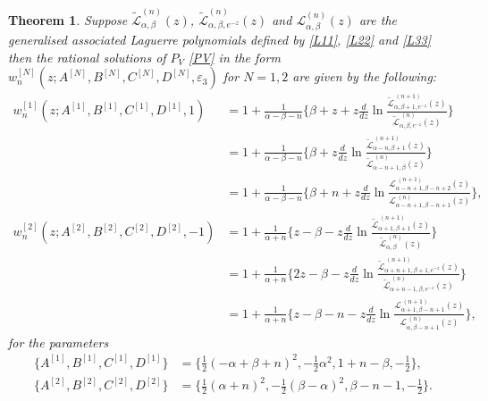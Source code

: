 \documentclass[12pt]{article}
\def\L{\mathcal{L}}
\newtheorem{mydef}{Theorem}[section]
\numberwithin{figure}{section}
\numberwithin{equation}{section}
\numberwithin{table}{section}
\begin{document}
\begin{mydef}
Suppose $\widetilde{\L}_{\alpha,\beta}^{(n)}(z)$, $\widetilde{\L}_{\alpha,\beta,e^{-z}}^{(n)}(z)$ and ${\L}_{\alpha,\beta}^{(n)}(z)$ are the generalised associated Laguerre polynomials defined by \eqref{L11}, \eqref{L22} and \eqref{L33} then the rational solutions of $P_{V}$ \eqref{PV} in the form $w_n^{[N]}(z;A^{[N]},B^{[N]},C^{[N]},D^{[N]},\varepsilon_3)$ for $N=1,2$ are given by the following:
\begin{subequations}
\begin{align}\nonumber
w_n^{[1]}(z;A^{[1]},B^{[1]},C^{[1]},D^{[1]},1)&=1+\frac{1}{\alpha-\beta-n}\bigg\{\beta+z+z\frac{d}{dz}\ln\frac{\mathcal{\widetilde L}_{\alpha,\beta+1,e^{-z}}^{~(n+1)}(z)}{\mathcal{\widetilde L}_{\alpha,\beta,e^{-z}}^{~(n)}(z)}\bigg\}\\\nonumber
&=1+\frac{1}{\alpha-\beta-n}\bigg\{\beta+z\frac{d}{dz}\ln\frac{\mathcal{\widetilde L}_{\alpha-n,\beta+1}^{~(n+1)}(z)}{\mathcal{\widetilde L}_{\alpha-n+1,\beta}^{~(n)}(z)}\bigg\}\\\nonumber
&=1+\frac{1}{\alpha-\beta-n}\bigg\{\beta+n+z\frac{d}{dz}\ln\frac{\mathcal{ L}_{\alpha-n+1,\beta-n+2}^{~(n+1)}(z)}{\mathcal{ L}_{\alpha-n+1,\beta-n+1}^{~(n)}(z)}\bigg\},\\\nonumber
w_n^{[2]}(z;A^{[2]},B^{[2]},C^{[2]},D^{[2]},-1)&=1+\frac{1}{\alpha+
n}\bigg\{z-\beta-z\frac{d}{dz}\ln\frac{\mathcal{\widetilde L}_{\alpha+1,\beta+1}^{~(n+1)}(z)}{\mathcal{\widetilde L}_{\alpha,\beta}^{~(n)}(z)}\bigg\}\\\nonumber
&=1+\frac{1}{\alpha+n}\bigg\{2z-\beta-z\frac{d}{dz}\ln\frac{\mathcal{\widetilde L}_{\alpha+n+1,\beta+1,e^{-z}}^{~(n+1)}(z)}{\mathcal{\widetilde L}_{\alpha+n-1,\beta,e^{-z}}^{~(n)}(z)}\bigg\}\\\nonumber
&=1+\frac{1}{\alpha+n}\bigg\{z-\beta-n-z\frac{d}{dz}\ln\frac{\mathcal{L}_{\alpha+1,\beta-n+1}^{~(n+1)}(z)}{\mathcal{L}_{\alpha,\beta-n+1}^{~(n)}(z)}\bigg\},
\end{align}
\end{subequations}
for the parameters
\begin{subequations}
\begin{align}
\{A^{[1]},B^{[1]},C^{[1]},D^{[1]}\}&=\{\tfrac{1}{2}(-\alpha+\beta+n)^2,-\tfrac{1}{2}\alpha^2,1+n-\beta,-\tfrac{1}{2}\},\label{J1}\\
\{A^{[2]},B^{[2]},C^{[2]},D^{[2]}\}&=\{\tfrac{1}{2}(\alpha+n)^2,-\tfrac{1}{2}(\beta-\alpha)^2,\beta-n-1,-\tfrac{1}{2}\}.\label{J2}
\end{align}
\end{subequations}
\end{mydef}
\end{document}
